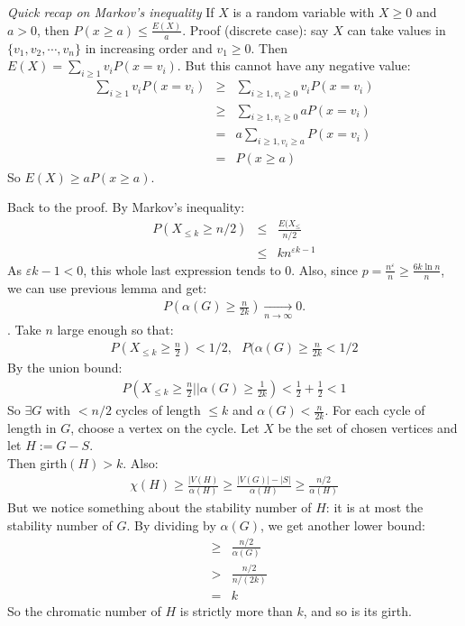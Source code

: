 \documentclass[11pt]{book}
\begin{document}
\textit{Quick recap on Markov's inequality}
If $X$ is a random variable with $X \geq 0$ and $a > 0$, then $P(x \geq a) \leq \frac{E(X)}{a}$. Proof (discrete case): say $X$ can take values in $\{v_1, v_2, \dotsb, v_n\}$ in increasing order and $v_1 \geq 0$. Then $E(X) = \sum_{i \geq 1} v_i P(x = v_i)$. But this cannot have any negative value: 
\begin{eqnarray}
	\sum_{i \geq 1} v_i P(x = v_i) &\geq& \sum_{i \geq 1, v_i \geq 0} v_i P(x = v_i) \\
	&\geq&\sum_{i \geq 1, v_i \geq 0}  aP(x = v_i) \\
	&=& a \sum_{i \geq 1, v_i \geq a} P(x = v_i)\\
	&=& P(x \geq a) 
\end{eqnarray} 	
So $E(X) \geq a P(x \geq a)$.
		
		
Back to the proof. By Markov's inequality:
\begin{eqnarray}
	P(X_{\leq k} \geq n/2) &\leq& \frac{E(X_{\leq}}{n/2} \\
	&\leq& k n^{\varepsilon k-1}
\end{eqnarray}
As $\varepsilon k-1 <0$, this whole last expression tends to 0. Also, since $p = \frac{n^\varepsilon}{n} \geq \frac{6k \ln n}{n}$, we can use previous lemma and get:
\begin{eqnarray}
	P(\alpha(G) \geq \frac{n}{2k}) \underset{n \rightarrow \infty}{\rightarrow} 0.
\end{eqnarray}.
Take $n$ large enough so that:
\begin{eqnarray}
	P(X_{\leq k} \geq \frac{n}{2}) < 1/2, ~~~
	P(\alpha(G) \geq \frac{n}{2k} < 1/2
\end{eqnarray}
By the union bound:
\begin{eqnarray}
	P(X_{\leq k} \geq \frac{n}{2} || \alpha(G) \geq \frac{1}{2k}) < \frac{1}{2} + \frac{1}{2} < 1
\end{eqnarray}
So $\exists G$ with $<n/2$ cycles of length $\leq k$ and $\alpha(G) < \frac{n}{2k}$. For each cycle of length in $G$, choose a vertex on the cycle. Let $X$ be the set of chosen vertices and let $H := G - S$.\\

Then girth$(H) > k$. Also:
\begin{eqnarray}
	\chi(H) \geq \frac{|V(H)}{\alpha(H)} \geq \frac{|V(G)| - |S|}{\alpha(H)} \geq \frac{n/2}{\alpha(H)}
\end{eqnarray} 
But we notice something about the stability number of $H$: it is at most the stability number of $G$. By dividing by $\alpha(G)$, we get another lower bound:
\begin{eqnarray}
	&\geq& \frac{n/2}{\alpha(G)}\\
	&>& \frac{n/2}{n/(2k)} \\
	&=& k
\end{eqnarray}
So the chromatic number of $H$ is strictly more than $k$, and so is its girth.
\end{document}
